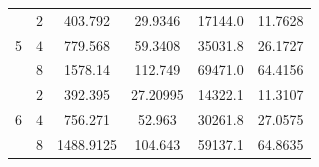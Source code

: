 \begin{table}[H]
\begin{tabular}{cc|cc|cc}
        \hline
        \multirow{3}{*}{5} & $2$    & 403.792   &  29.9346  &  17144.0  &  11.7628  \\
                           & $4$    & 779.568   &  59.3408  &  35031.8  &  26.1727  \\
                           & $8$    & 1578.14   &  112.749  &  69471.0  &  64.4156  \\
        \hline
        \multirow{3}{*}{6} & $2$    & 392.395   &  27.20995 &  14322.1  &  11.3107  \\
                           & $4$    & 756.271   &  52.963   &  30261.8  &  27.0575  \\
                           & $8$    & 1488.9125 &  104.643  &  59137.1  &  64.8635  \\
        \bottomrule
    \end{tabular}
\end{table}

